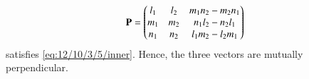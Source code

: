 \begin{align}
\mathbf{P} 
	=\begin{pmatrix}
l_1&l_2&m_1n_2-m_2n_1\\
        m_1&m_2&n_1l_2-n_2l_1\\
        n_1&n_2&l_1m_2-l_2m_1
\end{pmatrix}
	\end{align}
	satisfies 
\eqref{eq:12/10/3/5/inner}.
	Hence, the three vectors are mutually perpendicular.
